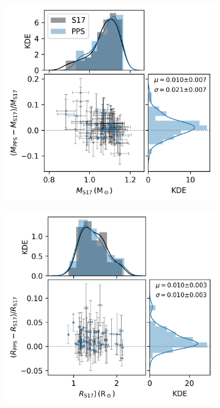 \documentclass[a4paper,fleqn,usenatbib]{mnras}
\begin{document}
\begin{figure}
    \centering
    \begin{subfigure}[b]{.33\linewidth}
        \includegraphics[width=\linewidth]{figures/mass_comp.png}
    \end{subfigure}%
    \begin{subfigure}[b]{.33\linewidth}
        \includegraphics[width=\linewidth]{figures/rad_comp.png}

\end{subfigure}
\end{figure}
\end{document}
